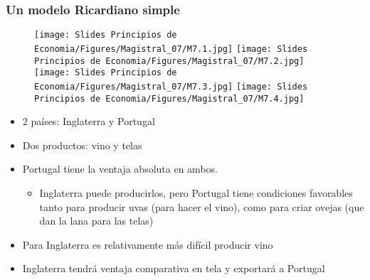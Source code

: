 \documentclass{beamer}
\begin{document}
\begin{frame}
\frametitle{Un modelo Ricardiano simple}

\begin{figure}
    \centering
    \texttt{[image: Slides Principios de Economia/Figures/Magistral\_07/M7.1.jpg]}
    \texttt{[image: Slides Principios de Economia/Figures/Magistral\_07/M7.2.jpg]}
    \hspace{15mm}
    \texttt{[image: Slides Principios de Economia/Figures/Magistral\_07/M7.3.jpg]}
    \texttt{[image: Slides Principios de Economia/Figures/Magistral\_07/M7.4.jpg]}
\end{figure}

\begin{itemize}
    \item 2 países: Inglaterra y Portugal\vspace{1.5mm}
    \item Dos productos: vino y telas\vspace{1.5mm}
    \item Portugal tiene la ventaja absoluta en ambos. 
        \begin{itemize}
        \item Inglaterra puede producirlos, pero Portugal tiene condiciones favorables tanto para producir uvas (para hacer el vino), como para criar ovejas (que dan la lana para las telas)\vspace{1.5mm}
        \end{itemize} 
    \item Para Inglaterra es relativamente más difícil producir vino\vspace{1.5mm}
    \item Inglaterra tendrá ventaja comparativa en tela y exportará a Portugal
\end{itemize} 
\end{frame}
\end{document}
